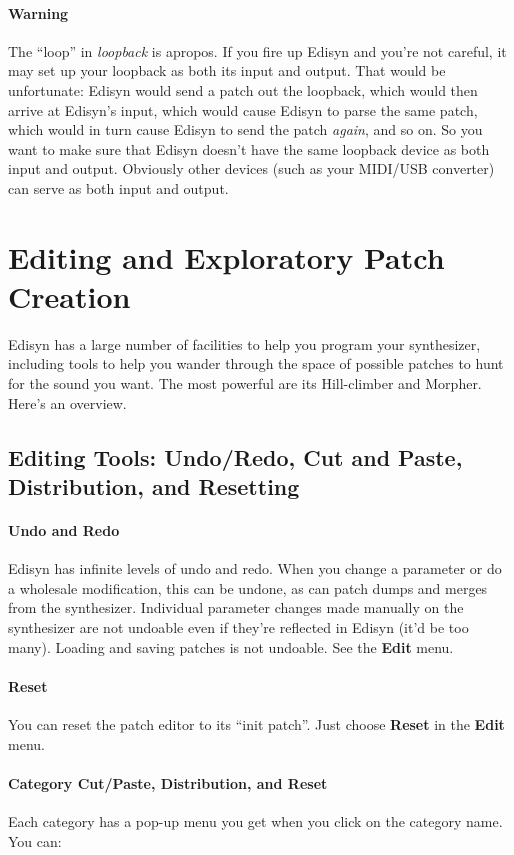 \documentclass{article}
\begin{document}
\paragraph{Warning}  The ``loop'' in {\it loopback} is apropos.  If you fire up Edisyn and you're not careful, it may set up your loopback as both its input and output.  That would be unfortunate: Edisyn would send a patch out the loopback, which would then arrive at Edisyn's input, which would cause Edisyn to parse the same patch, which would in turn cause Edisyn to send the patch {\it again}, and so on.  So you want to make sure that Edisyn doesn't have the same loopback device as both input and output.  Obviously other devices (such as your MIDI/USB converter) can serve as both input and output.

\section{Editing and Exploratory Patch Creation}
\label{editing}

Edisyn has a large number of facilities to help you program your synthesizer, including tools to help you wander through the  space of possible patches to hunt for the sound you want.  The most powerful are its Hill-climber and Morpher.   Here's an overview.

\subsection{Editing Tools: Undo/Redo, Cut and Paste, Distribution, and Resetting} 

\paragraph{Undo and Redo}  Edisyn has infinite levels of undo and redo.  When you change a parameter or do a wholesale modification, this can be undone, as can patch dumps and merges from the synthesizer.  Individual parameter changes made manually on the synthesizer are not undoable even if they're reflected in Edisyn (it'd be too many).  Loading and saving patches is not undoable.  See the {\bf Edit} menu.

\paragraph{Reset}  You can reset the patch editor to its ``init patch''.  Just choose {\bf Reset} in the {\bf Edit} menu.

\paragraph{Category Cut/Paste, Distribution, and Reset}  Each category has a pop-up menu you get when you click on the category name. You can:
\end{document}
